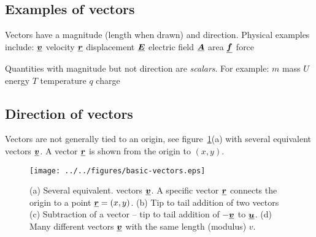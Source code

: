 



\addtolength{\topmargin}{-0.7 cm}
\setlength{\columnsep}{22pt}

\subsection*{Examples of vectors}
Vectors have a magnitude (length when drawn) and direction.  Physical examples include:\nl
$\mathit{\underline{\boldsymbol{v}}}$ velocity \nl
$\mathit{\underline{\boldsymbol{r}}}$ displacement \nl
$\mathit{\underline{\boldsymbol{E}}}$ electric field \nl
$\mathit{\underline{\boldsymbol{A}}}$ area \nl
$\mathit{\underline{\boldsymbol{f}}}$ force \nl

\noindent Quantities with magnitude but not direction are \emph{scalars}.  For example: \nl
$m$ mass \nl
$U$ energy \nl
$T$ temperature \nl
$q$ charge \nl

\subsection*{Direction of vectors}
Vectors are not generally tied to an origin, see figure~\ref{fig:basic-vectors}(a) with several equivalent vectors $\mathit{\underline{\boldsymbol{v}}}$. A vector $\mathit{\underline{\boldsymbol{r}}}$ is shown from the origin to $(x,y)$.
\begin{figure}[h!]
\centering
\texttt{[image: ../../figures/basic-vectors.eps]}
\caption{(a) Several equivalent. vectors $\mathit{\underline{\boldsymbol{v}}}$.  A specific vector $\mathit{\underline{\boldsymbol{r}}}$ connects the origin to a point $\mathit{\underline{\boldsymbol{r}}} = (x,y)$.  (b) Tip to tail addition of two vectors (c) Subtraction of a vector -- tip to tail addition of $-\mathit{\underline{\boldsymbol{v}}}$ to $\mathit{\underline{\boldsymbol{u}}}$.  (d) Many different vectors $\mathit{\underline{\boldsymbol{v}}}$ with the same length (modulus) $v$. }\label{fig:basic-vectors}
\end{figure}
